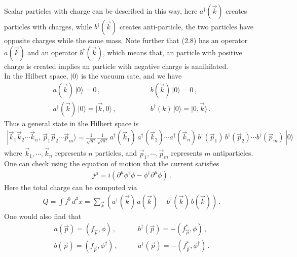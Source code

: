 \documentclass[11pt, onesided]{book}
\theoremstyle{break}
\theoremstyle{break}
\newcommand{\pd}{\partial}
\begin{document}
Scalar particles with charge can be described in this way, here $a^\dagger(\vec{k})$ creates particles with charges, while $b^\dagger(\vec{k})$ creates anti-particle, the two particles have opposite charges while the same mass. Note further that (2.8) has an operator $a(\vec{k})$ and an operator $b^\dagger(\vec{k})$, which means that, an particle with positive charge is created implies an particle with negative charge is annihilated.\\

In the Hilbert space, $|0\rangle$ is the vacuum sate, and we have
\begin{align*}
a(\vec{k}) \,|0\rangle = 0\,,\qquad\qquad & b(\vec{k})\,|0\rangle = 0\,,\\
a^\dagger(\vec{k})\,|0\rangle = |\vec{k},0\rangle \,,\qquad\qquad &b^\dagger(k)\, |0\rangle = |0,\vec{k}\rangle\,.
\end{align*}
Thus a general state in the Hilbert space is
\begin{align*}
|\vec{k}_1\vec{k}_2\cdots\vec{k}_n, \,\vec{p}_1\vec{p}_2\cdots\vec{p}_m\rangle = \frac{1}{\sqrt{n!}}\frac{1}{\sqrt{m!}}\, a^\dagger(\vec{k}_1)\,a^\dagger(\vec{k}_2)\cdots a^\dagger(\vec{k}_n)\, b^\dagger(\vec{p}_1)\,b^\dagger(\vec{p}_2) \cdots b^\dagger(\vec{p}_m)\, |0\rangle
\end{align*}
where $\vec{k}_1,\cdots,\vec{k}_n$ represents $n$ particles, and $\vec{p}_1,\cdots, \vec{p}_m$ represents $m$ antiparticles. One can check using the equation of motion that the current satisfies
\begin{align*}
j^\mu = i\left(\pd^\mu \phi^\dagger\phi - \phi^\dagger \pd^{\mu} \phi\right)\,.
\end{align*}
Here the total charge can be computed via
\begin{align*}
Q = \int j^0 \, d^3x  = \sum_{\vec{k}}\left( a^\dagger(\vec{k})\, a(\vec{k})  - b^\dagger(\vec{k})\, b(\vec{k})\right)\,.
\end{align*}
One would also find that
\begin{align*}
a(\vec{p}) = (f_{\vec{p}}, \phi)\,, \qquad
&b^\dagger(\vec{p}) = -(f_{\vec{p}}^*, \phi)\,,\\
b(\vec{p}) = (f_{\vec{p}}, \phi^\dagger)\,, \qquad
&a^\dagger(\vec{p}) = -(f_{\vec{p}}^*, \phi^\dagger)\,.\\ 
\end{align*}
\end{document}

